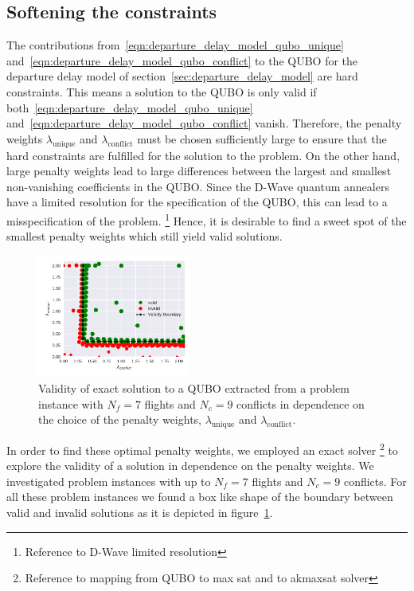 \subsection{Softening the constraints}
The contributions from~\eqref{eqn:departure_delay_model_qubo_unique} and~\eqref{eqn:departure_delay_model_qubo_conflict} to the QUBO for the departure delay model of section~\ref{sec:departure_delay_model} are hard constraints.
This means a solution to the QUBO is only valid if both~\eqref{eqn:departure_delay_model_qubo_unique} and~\eqref{eqn:departure_delay_model_qubo_conflict} vanish.
Therefore, the penalty weights $\lambda_\text{unique}$ and $\lambda_\text{conflict}$ must be chosen sufficiently large to ensure that the hard constraints are fulfilled for the solution to the problem.
On the other hand, large penalty weights lead to large differences between the largest and smallest non-vanishing coefficients in the QUBO.\@
Since the D-Wave quantum annealers have a limited resolution for the specification of the QUBO, this can lead to a misspecification of the problem.
\footnote{Reference to D-Wave limited resolution}
Hence, it is desirable to find a sweet spot of the smallest penalty weights which still yield valid solutions.

\begin{figure}[htpb]
    \centering
    \includegraphics[width=0.45\textwidth]{./pics/validity_boundary_example.pdf}
    \caption{Validity of exact solution to a QUBO extracted from a problem instance with $N_f=7$ flights and $N_c=9$ conflicts in dependence on the choice of the penalty weights, $\lambda_\text{unique}$ and $\lambda_\text{conflict}$.}
\label{fig:penalty_weights}
\end{figure}

In order to find these optimal penalty weights, we employed an exact solver
\footnote{Reference to mapping from QUBO to max sat and to akmaxsat solver} to explore the validity of a solution in dependence on the penalty weights.
We investigated problem instances with up to $N_f=7$ flights and $N_c=9$ conflicts.
For all these problem instances we found a box like shape of the boundary between valid and invalid solutions as it is depicted in figure~\ref{fig:penalty_weights}.

